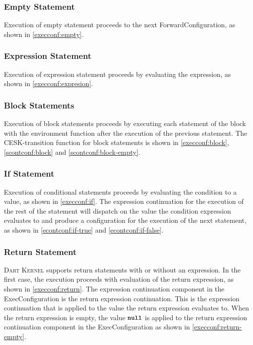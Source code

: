 \documentclass[a4paper,oneside,fleqn]{article}
\newcommand{\kernel}{\textsc{Dart Kernel}}
\newcommand{\synt}[1]{\ensuremath{\text{\textbf{\texttt{#1}}}}}
\DeclareMathOperator{\nnull}{\synt{null}}
\begin{document}
\subsubsection{Empty Statement}
\label{subsubsec:emtpy-stmt}

Execution of empty statement proceeds to the next ForwardConfiguration, as shown in \eqref{execconf:empty}.


\subsubsection{Expression Statement}
\label{expression-stmt}

Execution of expression statement proceeds by evaluating the expression, as shown in \eqref{execconf:expresion}.


\subsubsection{Block Statements}

Execution of block statements proceeds by executing each statement of the block with the environment function after the execution of the previous statement.
The CESK-transition function for block statements is shown in \eqref{execconf:block}, \eqref{scontconf:block} and \eqref{scontconf:block-empty}.


\subsubsection{If Statement}

Execution of conditional statements proceeds by evaluating the condition to a value, as shown in \eqref{execconf:if}.
The expression continuation for the execution of the rest of the statement will dispatch on the value the condition expression evaluates to and produce a configuration for the execution of the next statement, as shown in \eqref{econtconf:if-true} and \eqref{econtconf:if-false}.


\subsubsection{Return Statement}

\kernel{} supports return statements with or without an expression.
In the first case, the execution proceeds with evaluation of the return expression, as shown in \eqref{execconf:return}.
The expression continuation component in the ExecConfiguration is the return expression continuation.
This is the expression continuation that is applied to the value the return expression evaluates to.
When the return expression is empty, the value $\nnull$ is applied to the return expression continuation component in the ExecConfiguration as shown in \eqref{execconf:return-empty}.
\end{document}
